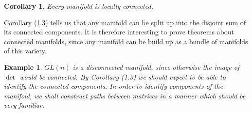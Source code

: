 \documentclass[12pt]{report}
\theoremstyle{plain}
\newtheorem{corollary}[theorem]{Corollary}
\newtheorem*{example}{Example}
\theoremstyle{definition}
\begin{document}
\begin{corollary}
    Every manifold is locally connected.
\end{corollary}

Corollary (1.3) tells us that any manifold can be split up into the disjoint sum of its connected components. It is therefore interesting to prove theorems about connected manifolds, since any manifold can be build up as a bundle of manifolds of this variety.

\begin{example}
    $GL(n)$ is a disconnected manifold, since otherwise the image of $\det$ would be connected. By Corollary (1.3) we should expect to be able to identify the connected components. In order to identify components of the manifold, we shall construct paths between matrices in a manner which should be very familiar.


\end{example}
\end{document}
